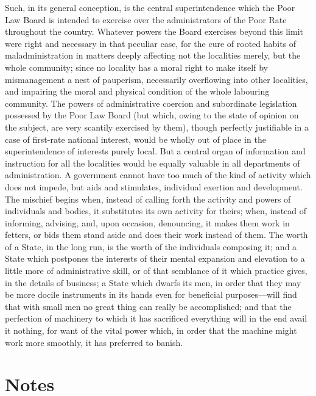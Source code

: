 \documentclass[11pt,openany]{book}
\newcommand{\bookbackmatter}[1]{%
  \clearpage\phantomsection\chapter*{#1}%
  \addcontentsline{toc}{chapter}{#1}\markboth{#1}{#1}\thispagestyle{plain}}
\begin{document}
Such, in its general conception, is the central superintendence which the Poor Law Board is intended to exercise over the administrators of the Poor Rate throughout the country. Whatever powers the Board exercises beyond this limit were right and necessary in that peculiar case, for the cure of rooted habits of maladministration in matters deeply affecting not the localities merely, but the whole community; since no locality has a moral right to make itself by mismanagement a nest of pauperism, necessarily overflowing into other localities, and impairing the moral and physical condition of the whole labouring community. The powers of administrative coercion and subordinate legislation possessed by the Poor Law Board (but which, owing to the state of opinion on the subject, are very scantily exercised by them), though perfectly justifiable in a case of first-rate national interest, would be wholly out of place in the superintendence of interests purely local. But a central organ of information and instruction for all the localities would be equally valuable in all departments of administration. A government cannot have too much of the kind of activity which does not impede, but aids and stimulates, individual exertion and development. The mischief begins when, instead of calling forth the activity and powers of individuals and bodies, it substitutes its own activity for theirs; when, instead of informing, advising, and, upon occasion, denouncing, it makes them work in fetters, or bids them stand aside and does their work instead of them. The worth of a State, in the long run, is the worth of the individuals composing it; and a State which postpones the interests of their mental expansion and elevation to a little more of administrative skill, or of that semblance of it which practice gives, in the details of business; a State which dwarfs its men, in order that they may be more docile instruments in its hands even for beneficial purposes---will find that with small men no great thing can really be accomplished; and that the perfection of machinery to which it has sacrificed everything will in the end avail it nothing, for want of the vital power which, in order that the machine might work more smoothly, it has preferred to banish.

\bookbackmatter{Notes}
\end{document}
